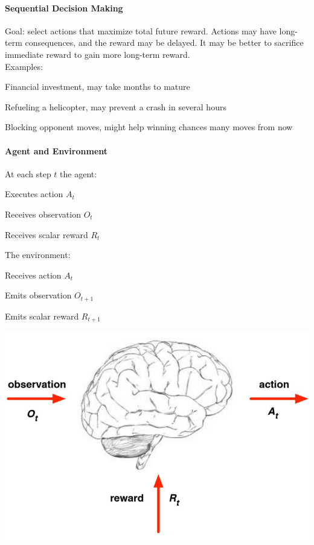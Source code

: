 \documentclass[10pt]{report}
\begin{document}
\paragraph{Sequential Decision Making} Goal: select actions that maximize total future reward. Actions may have long-term consequences, and the reward may be delayed. It may be better to sacrifice immediate reward to gain more long-term reward.\\
Examples:
\begin{list}{}{}
	\item Financial investment, may take months to mature
	\item Refueling a helicopter, may prevent a crash in several hours
	\item Blocking opponent moves, might help winning chances many moves from now
\end{list}
\begin{multicols}{2}
\paragraph{Agent and Environment} At each step $t$ the agent:
\begin{list}{}{}
	\item Executes action $A_t$
	\item Receives observation $O_t$
	\item Receives scalar reward $R_t$
\end{list}
The environment:
\begin{list}{}{}
	\item Receives action $A_t$
	\item Emits observation $O_{t+1}$
	\item Emits scalar reward $R_{t+1}$
\end{list}
\begin{center}
	\includegraphics[scale=0.45]{215.png}
\end{center}
\end{multicols}
\end{document}
